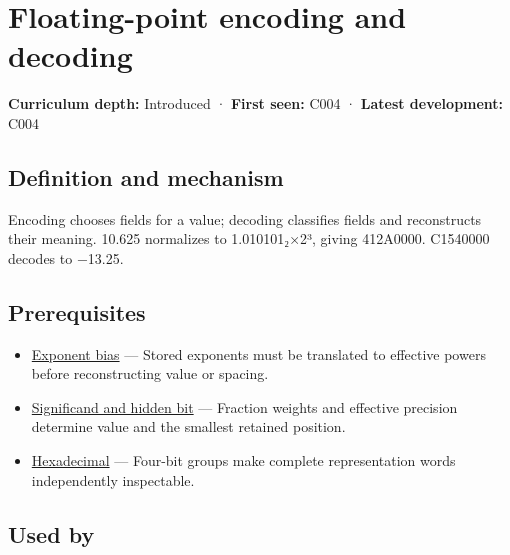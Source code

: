 \hypertarget{appendix-6854d0e2218e}{}\label{referencestart:appendix-6854d0e2218e}
\section{Floating-point encoding and decoding}\label{appendix-6854d0e2218e-floating-point-encoding-and-decoding}

\hypertarget{appendix-6854d0e2218e-floating-point-encoding-and-decoding}{}

\textbf{Curriculum depth:} Introduced · \textbf{First seen:} C004 · \textbf{Latest development:} C004

\begin{allmightroledefinition}

\subsection{Definition and mechanism}\label{appendix-6854d0e2218e-definition-and-mechanism}

\hypertarget{appendix-6854d0e2218e-definition-and-mechanism}{}

Encoding chooses fields for a value; decoding classifies fields and reconstructs their meaning. 10.625 normalizes to 1.010101₂×2³, giving 412A0000. C1540000 decodes to −13.25.

\end{allmightroledefinition}

\subsection{Prerequisites}\label{appendix-6854d0e2218e-prerequisites}

\hypertarget{appendix-6854d0e2218e-prerequisites}{}

\begin{itemize}
\tightlist
\item
  \hyperref[appendix-2fae058c82e1]{Exponent bias} --- Stored exponents must be translated to effective powers before reconstructing value or spacing.
\item
  \hyperref[appendix-a24fd710cf67]{Significand and hidden bit} --- Fraction weights and effective precision determine value and the smallest retained position.
\item
  \hyperref[appendix-6b8075763724]{Hexadecimal} --- Four-bit groups make complete representation words independently inspectable.
\end{itemize}

\subsection{Used by}\label{appendix-6854d0e2218e-used-by}

